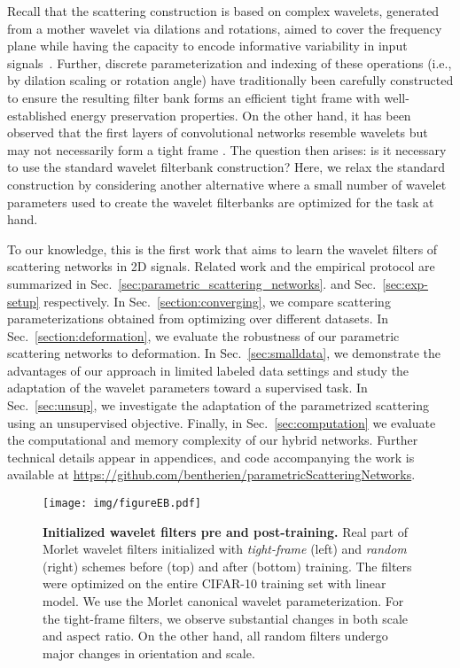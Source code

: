 \documentclass[10pt,twocolumn,letterpaper]{article}
\begin{document}
Recall that the scattering construction is based on complex wavelets, generated from a mother wavelet via dilations and rotations, aimed to cover the frequency plane while having the capacity to encode informative variability in input signals~\cite{bruna2013invariant}. Further, discrete parameterization and indexing of these operations (i.e., by dilation scaling or rotation angle) have traditionally been carefully constructed to ensure the resulting filter bank forms an efficient tight frame \cite{mallat1999wavelet,mallat2012group} with well-established energy preservation properties. On the other hand, it has been observed that the first layers of convolutional networks resemble wavelets but may not necessarily form a tight frame \cite{krizhevsky2012imagenet}. The question then arises: is it necessary to use the standard wavelet filterbank construction? Here, we relax the standard construction by considering another alternative where a small number of wavelet parameters used to create the wavelet filterbanks are optimized for the task at hand.




To our knowledge, this is the first work that aims to learn the wavelet filters of scattering networks in 2D signals.
Related work and the empirical protocol are summarized in Sec.~\ref{sec:parametric_scattering_networks}. and  Sec.~\ref{sec:exp-setup} respectively.  In Sec.~\ref{section:converging}, we compare scattering parameterizations obtained from optimizing over different datasets. In Sec.~\ref{section:deformation}, we evaluate the robustness of our parametric scattering networks to deformation. In Sec.~\ref{sec:smalldata}, we demonstrate the advantages of our approach in limited labeled data settings and study the adaptation of the wavelet parameters toward a supervised task. In Sec.~\ref{sec:unsup}, we investigate the adaptation of the parametrized scattering using an unsupervised objective. Finally, in Sec.~\ref{sec:computation} we evaluate the computational and memory complexity of our hybrid networks. Further technical details appear in appendices, and code accompanying the work is available at \url{https://github.com/bentherien/parametricScatteringNetworks}.




\begin{figure*}
    \centering
    \texttt{[image: img/figureEB.pdf]}
    \caption{\textbf{Initialized wavelet filters pre and post-training.} Real part of Morlet wavelet filters initialized with \textit{tight-frame} (left) and  \textit{random} (right) schemes before (top) and after (bottom) training. The filters were optimized on the entire CIFAR-10 training set with linear model. We use the Morlet canonical wavelet parameterization. For the tight-frame filters, we observe substantial changes in both scale and aspect ratio. On the other hand, all random filters undergo major changes in orientation and scale. }
    \label{fig:filters-cifar-real-before-kymatio}
    \vspace{-10pt}
\end{figure*}
\vspace{-5pt}
\end{document}

